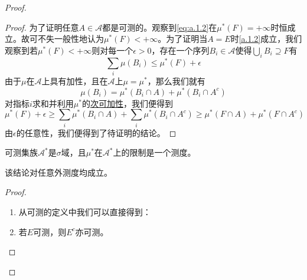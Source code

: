\documentclass[main.tex]{subfiles}
\begin{document}
\begin{proof}
\begin{proof}
		为了证明任意\(A\in\mathcal{A}\)都是可测的。观察到\eqref{eq:a.1.2}在\(\mu^*(F) = +\infty\)时恒成立。故可不失一般性地认为\(\mu^*(F) < +\infty\)。为了证明当\(A = E\)时\eqref{a.1.2}成立，我们观察到若\(\mu^*(F) < +\infty\)则对每一个\(\epsilon>0\)，存在一个序列\(B_i \in \mathcal{A}\)使得\(\bigcup_i B_i \supseteq F\)有
		\[\sum_i \mu(B_i) \leq \mu^*(F)+\epsilon\]
		由于\(\mu\)在\(\mathcal{A}\)上具有加性，且在\(\mathcal{A}\)上\(\mu = \mu^*\)，那么我们就有
		\[\mu(B_i) = \mu^*(B_i\cap A)+\mu^*(B_i\cap A^c)\]
		对指标\(i\)求和并利用\(\mu^*\)的\hyperref[prop:a.1.subadditivity]{次可加性}，我们便得到
		\[\mu^*(F)+\epsilon\geq\sum_i \mu^*(B_i\cap A)+\sum_i \mu^*(B_i\cap A^c)\geq\mu^*(F\cap A)+\mu^*(F\cap A^c)\]
		由\(\epsilon\)的任意性，我们便得到了待证明的结论。
	\end{proof}
	\begin{lemma} \label{lem:a.1.7}
		可测集族\(\mathcal{A}^*\)是\(\sigma\)域，且\(\mu^*\)在\(\mathcal{A}^*\)上的限制是一个测度。
	\end{lemma}
	\begin{remark}
		该结论对任意外测度均成立。
	\end{remark}
	\begin{proof}
		\begin{enumerate}[label=(\alph*)]
			\item[] 从可测的定义中我们可以直接得到：
			\item\label{proof:a.1.7.a} 若\(E\)可测，则\(E^c\)亦可测。


\end{enumerate}
\end{proof}
\end{proof}
\end{document}
